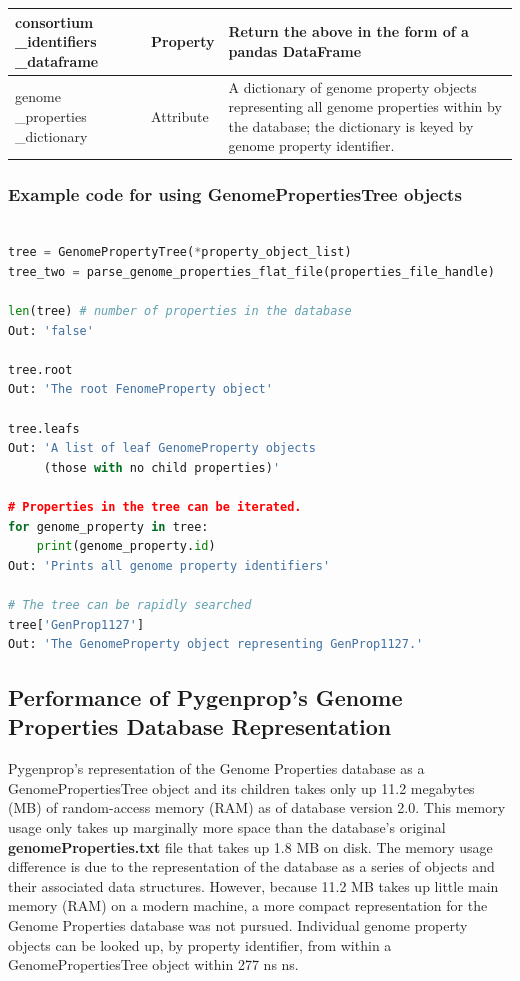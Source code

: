 \begin{longtable}{|p{2.7cm}|p{2cm}|p{10cm}|}
consortium \_identifiers \_dataframe   & Property  & Return the above in the form of a pandas DataFrame  \cite{mckinney2010data}                                                        \\ \hline
genome \_properties \_dictionary    & Attribute  & A dictionary of genome property objects representing all genome properties within by the database; the dictionary is keyed by genome property identifier.                              \\ \hline
\end{longtable}

\subsubsection{Example code for using GenomePropertiesTree objects}

\begin{lstlisting}[language=Python]

tree = GenomePropertyTree(*property_object_list)
tree_two = parse_genome_properties_flat_file(properties_file_handle)
	
len(tree) # number of properties in the database
Out: 'false'

tree.root
Out: 'The root FenomeProperty object'

tree.leafs
Out: 'A list of leaf GenomeProperty objects 
     (those with no child properties)'

# Properties in the tree can be iterated.
for genome_property in tree: 
	print(genome_property.id)
Out: 'Prints all genome property identifiers'

# The tree can be rapidly searched
tree['GenProp1127'] 
Out: 'The GenomeProperty object representing GenProp1127.'

\end{lstlisting}

\subsection{Performance of Pygenprop's Genome Properties Database Representation}

Pygenprop's representation of the Genome Properties database as a GenomePropertiesTree object and its children takes only up 11.2 megabytes (MB) of random-access memory (RAM) as of database version 2.0. This memory usage only takes up marginally more space than the database's original \textbf{genomeProperties.txt} file that takes up 1.8 MB on disk. The memory usage difference is due to the representation of the database as a series of objects and their associated data structures. However, because 11.2 MB takes up little main memory (RAM) on a modern machine, a more compact representation for the Genome Properties database was not pursued. Individual genome property objects can be looked up, by property identifier, from within a GenomePropertiesTree object within 277 ns  ns.

